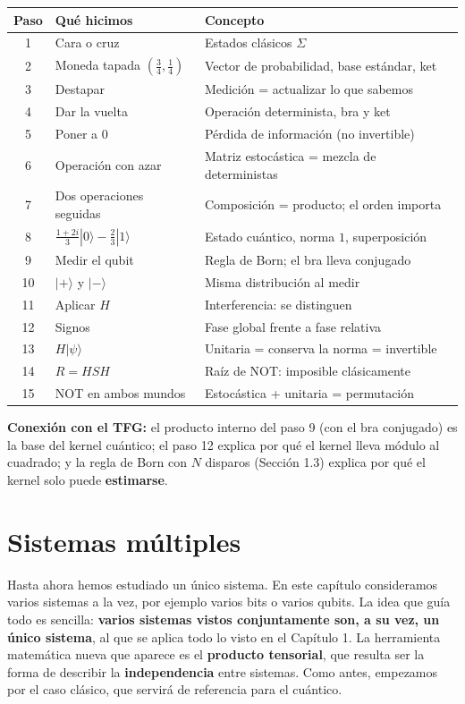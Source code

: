 \documentclass[11pt, a4paper, twoside, openright]{report}
\begin{document}
\begin{center}
\small\renewcommand{\arraystretch}{1.15}
\begin{tabular}{c|l|l}
\textbf{Paso} & \textbf{Qué hicimos} & \textbf{Concepto} \\ \hline
1 & Cara o cruz & Estados clásicos $\Sigma$ \\
2 & Moneda tapada $\left(\frac34,\frac14\right)$ & Vector de probabilidad, base estándar, ket \\
3 & Destapar & Medición = actualizar lo que sabemos \\
4 & Dar la vuelta & Operación determinista, bra y ket \\
5 & Poner a $0$ & Pérdida de información (no invertible) \\
6 & Operación con azar & Matriz estocástica = mezcla de deterministas \\
7 & Dos operaciones seguidas & Composición = producto; el orden importa \\
8 & $\frac{1+2i}{3}|0\rangle - \frac23|1\rangle$ & Estado cuántico, norma $1$, superposición \\
9 & Medir el qubit & Regla de Born; el bra lleva conjugado \\
10 & $|+\rangle$ y $|-\rangle$ & Misma distribución al medir \\
11 & Aplicar $H$ & Interferencia: se distinguen \\
12 & Signos & Fase global frente a fase relativa \\
13 & $H|\psi\rangle$ & Unitaria = conserva la norma = invertible \\
14 & $R = HSH$ & Raíz de NOT: imposible clásicamente \\
15 & NOT en ambos mundos & Estocástica + unitaria = permutación
\end{tabular}
\end{center}

\noindent \textbf{Conexión con el TFG:} el producto interno del paso 9 (con el bra conjugado) es la base del kernel cuántico; el paso 12 explica por qué el kernel lleva módulo al cuadrado; y la regla de Born con $N$ disparos (Sección 1.3) explica por qué el kernel solo puede \textbf{estimarse}.


\chapter{Sistemas múltiples}


\noindent Hasta ahora hemos estudiado un único sistema. En este capítulo consideramos varios sistemas a la vez, por ejemplo varios bits o varios qubits. La idea que guía todo es sencilla: \textbf{varios sistemas vistos conjuntamente son, a su vez, un único sistema}, al que se aplica todo lo visto en el Capítulo 1. La herramienta matemática nueva que aparece es el \textbf{producto tensorial}, que resulta ser la forma de describir la \textbf{independencia} entre sistemas. Como antes, empezamos por el caso clásico, que servirá de referencia para el cuántico.
\end{document}
